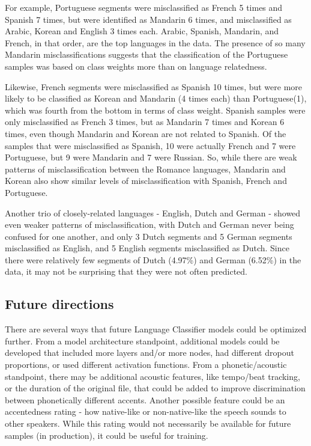 For example, Portuguese segments were misclassified as French 5 times and Spanish 7 times, but were identified as Mandarin 6 times, and misclassified as Arabic, Korean and English 3 times each. Arabic, Spanish, Mandarin, and French, in that order, are the top languages in the data. The presence of so many Mandarin misclassifications suggests that the classification of the Portuguese samples was based on class weights more than on language relatedness.

Likewise, French segments were misclassified as Spanish 10 times, but were more likely to be classified as Korean and Mandarin (4 times each) than Portuguese(1), which was fourth from the bottom in terms of class weight. Spanish samples were only misclassified as French 3 times, but as Mandarin 7 times and Korean 6 times, even though Mandarin and Korean are not related to Spanish. Of the samples that were misclassified as Spanish, 10 were actually French and 7 were Portuguese, but 9 were Mandarin and 7 were Russian. So, while there are weak patterns of misclassification between the Romance languages, Mandarin and Korean also show similar levels of misclassification with Spanish, French and Portuguese. 

Another trio of closely-related languages - English, Dutch and German - showed even weaker patterns of misclassification, with Dutch and German never being confused for one another, and only 3 Dutch segments and 5 German segments misclassified as English, and 5 English segments misclassified as Dutch. Since there were relatively few segments of Dutch (4.97\%) and German (6.52\%) in the data, it may not be surprising that they were not often predicted.

\subsection{Future directions}
There are several ways that future Language Classifier models could be optimized further. From a model architecture standpoint, additional models could be developed that included more layers and/or more nodes, had different dropout proportions, or used different activation functions. From a phonetic/acoustic standpoint, there may be additional acoustic features, like tempo/beat tracking, or the duration of the original file, that could be added to improve discrimination between phonetically different accents. Another possible feature %
could be an accentedness rating - how native-like or non-native-like the speech sounds to other speakers. While this rating would not necessarily be available for future samples (in production), it could be useful for training.

